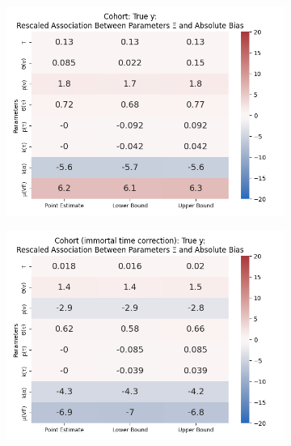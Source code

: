 \documentclass[12pt]{article}
\begin{document}
\begin{figure}[H]
	\centering
	\caption{Rescaled Association Between Parameters $\Xi$ and Absolute Bias By Study Design ($p_v=0.5$; $\Theta_{\tau}=0.75$; $p_\tau=0.5$; $k_\tau=0.75$; $k_\alpha=0.75$)}
	\begin{subfigure}[t]{0.23\linewidth}
		\centering
		\caption{}
		\includegraphics[scale=0.25]{VEMethod_Drivers1b_FEest_Realistic_Li_MSpec_Heatmap1.png}
	\end{subfigure}
	\begin{subfigure}[t]{0.23\linewidth}
		\centering
		\caption{}
		\includegraphics[scale=0.25]{VEMethod_Drivers1b_FEest_Realistic_Li_MSpec_Heatmap2.png}
	\end{subfigure}

\end{figure}
\end{document}

